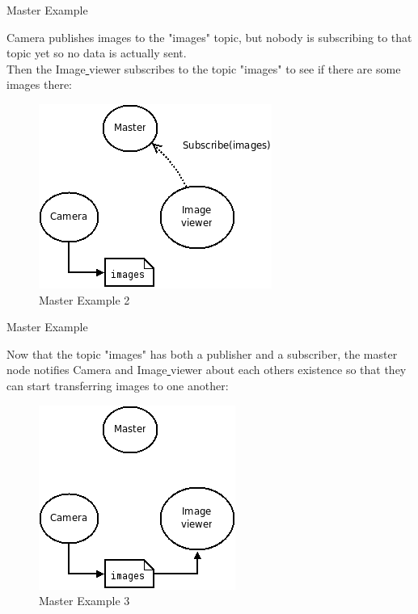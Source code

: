 \documentclass{beamer}
\begin{document}
\begin{frame}{Master Example}
	
	Camera publishes images to the "images" topic, but nobody is subscribing to that topic yet so no data is actually sent. \\ 
	Then the Image\underline{ }viewer subscribes to the topic "images" to see if there are some images there: 
	
	\begin{figure}[H]
		\centering
		\includegraphics[scale=0.6]{./images/ROS_master_example_english_2.png}
		\caption{Master Example 2}
		\label{fig:ros_master_example_2}
	\end{figure}
	
	
\end{frame}

\begin{frame}{Master Example}
	
	Now that the topic "images" has both a publisher and a subscriber, the master node notifies Camera and Image\underline{ }viewer about each others existence so that they can start transferring images to one another: 
	
	\begin{figure}[H]
		\centering
		\includegraphics[scale=0.65]{./images/ROS_master_example_english_3.png}
		\caption{Master Example 3}
		\label{fig:ros_master_example_3}
	\end{figure}
	
	
\end{frame}
\end{document}

